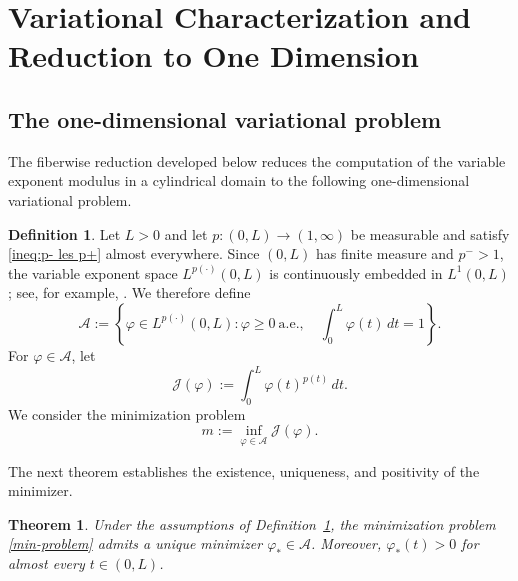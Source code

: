 \documentclass[12pt]{amsart}
\numberwithin{equation}{section}
\theoremstyle{plain}
\newtheorem{theorem}[equation]{Theorem}
\theoremstyle{definition}
\newtheorem{definition}[equation]{Definition}
\begin{document}
\section{Variational Characterization and Reduction to One Dimension}
\label{sec:variational}

\subsection{The one-dimensional variational problem}
\label{subsec:1d_problem}

The fiberwise reduction developed below reduces the computation of the
variable exponent modulus in a cylindrical domain to the following
one-dimensional variational problem.

\begin{definition}
\label{def:1d_problem}
Let $L>0$ and let $p:(0,L)\longrightarrow(1,\infty)$
be measurable and satisfy \eqref{ineq:p- les p+}
almost everywhere.
Since $(0,L)$ has finite measure and $p^->1$, the variable exponent
space $L^{p(\cdot)}(0,L)$ is continuously embedded in $L^1(0,L)$; see,
for example, \cite[Section~3.3]{Diening2011}. We therefore define
\begin{equation*}
\mathcal A
:=
\left\{
\varphi\in L^{p(\cdot)}(0,L):
\varphi\ge0\ \text{a.e.},\quad
\int_0^L\varphi(t)\,dt=1
\right\}.
\end{equation*}
For $\varphi\in\mathcal A$, let
\begin{equation*}
\mathcal J(\varphi)
:=
\int_0^L\varphi(t)^{p(t)}\,dt.
\end{equation*}
We consider the minimization problem
\begin{equation}\label{min-problem}
m
:=
\inf_{\varphi\in\mathcal A}\mathcal J(\varphi).
\end{equation}
\end{definition}

The next theorem establishes the existence, uniqueness, and positivity
of the minimizer.

\begin{theorem}
\label{thm:existence}
Under the assumptions of Definition~\ref{def:1d_problem}, the
minimization problem \eqref{min-problem}
admits a unique minimizer $\varphi_*\in\mathcal A$.
Moreover, $\varphi_*(t)>0$ for almost every $t\in(0,L)$.
\end{theorem}
\end{document}
